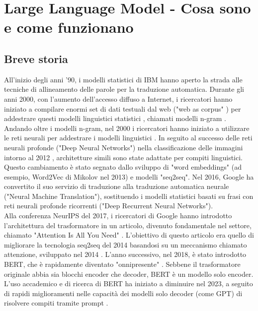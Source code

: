 ﻿\chapter{Large Language Model - Cosa sono e come funzionano}

\section{Breve storia}

All'inizio degli anni '90, i modelli statistici di IBM hanno aperto la strada alle tecniche di allineamento delle parole per la traduzione automatica. Durante gli anni 2000, con l'aumento dell'accesso diffuso a Internet, i ricercatori hanno iniziato a compilare enormi set di dati testuali dal web ("web as corpus" \cite{kilgarriff2003webascorpus}) per addestrare questi modelli linguistici statistici \cite{banko2001scaling}\cite{resnik2003webparallel}, chiamati modelli n-gram \cite{goodman2001progress}. \\
Andando oltre i modelli n-gram, nel 2000 i ricercatori hanno iniziato a utilizzare le reti neurali per addestrare i modelli linguistici \cite{xu2000annlm}. In seguito al successo delle reti neurali profonde ("Deep Neural Networks") nella classificazione delle immagini intorno al 2012 \cite{chen2021cnnreview}, architetture simili sono state adattate per compiti linguistici. Questo cambiamento è stato segnato dallo sviluppo di "word embeddings" (ad esempio, Word2Vec di Mikolov nel 2013) e modelli "seq2seq". Nel 2016, Google ha convertito il suo servizio di traduzione alla traduzione automatica neurale ("Neural Machine Translation"), sostituendo i modelli statistici basati su frasi con reti neurali profonde ricorrenti ("Deep Recurrent Neural Networks"). \\
Alla conferenza NeurIPS del 2017, i ricercatori di Google hanno introdotto l'architettura del trasformatore in un articolo, divenuto fondamentale nel settore, chiamato "Attention Is All You Need" \cite{vaswani2017attention}. L'obiettivo di questo articolo era quello di migliorare la tecnologia seq2seq del 2014 basandosi su un meccanismo chiamato attenzione, sviluppato nel 2014 \cite{bahdanau2014nmt}. L'anno successivo, nel 2018, è stato introdotto BERT, che è rapidamente diventato "onnipresente" \cite{rogers2020bertology}. Sebbene il trasformatore originale abbia sia blocchi encoder che decoder, BERT è un modello solo encoder. L'uso accademico e di ricerca di BERT ha iniziato a diminuire nel 2023, a seguito di rapidi miglioramenti nelle capacità dei modelli solo decoder (come GPT) di risolvere compiti tramite prompt \cite{movva2024topics}. \\
